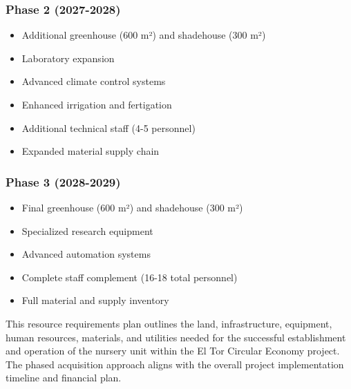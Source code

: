 \subsubsection{Phase 2 (2027-2028)}
\begin{itemize}
    \item Additional greenhouse (600 m²) and shadehouse (300 m²)
    \item Laboratory expansion
    \item Advanced climate control systems
    \item Enhanced irrigation and fertigation
    \item Additional technical staff (4-5 personnel)
    \item Expanded material supply chain
\end{itemize}

\subsubsection{Phase 3 (2028-2029)}
\begin{itemize}
    \item Final greenhouse (600 m²) and shadehouse (300 m²)
    \item Specialized research equipment
    \item Advanced automation systems
    \item Complete staff complement (16-18 total personnel)
    \item Full material and supply inventory
\end{itemize}

This resource requirements plan outlines the land, infrastructure, equipment, human resources, materials, and utilities needed for the successful establishment and operation of the nursery unit within the El Tor Circular Economy project. The phased acquisition approach aligns with the overall project implementation timeline and financial plan. 